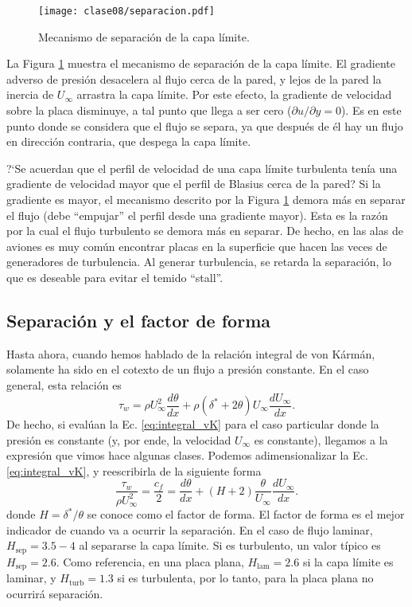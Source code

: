 \begin{figure}
\centering
\texttt{[image: clase08/separacion.pdf]}
\caption{Mecanismo de separación de la capa límite.}
\label{fig:separacion}
\end{figure}

La Figura \ref{fig:separacion} muestra el mecanismo de separación de la capa límite.
El gradiente adverso de presión desacelera al flujo cerca de la pared, y lejos de la pared la inercia de $U_\infty$ arrastra la capa límite.
Por este efecto, la gradiente de velocidad sobre la placa disminuye, a tal punto que llega a ser cero ($\partial u/\partial y=0$).
Es en este punto donde se considera que el flujo se separa, ya que después de él hay un flujo en dirección contraria, que despega la capa límite.

\mbox{?`}Se acuerdan que el perfil de velocidad de una capa límite turbulenta tenía una gradiente de velocidad mayor que el perfil de Blasius cerca de la pared?
Si la gradiente es mayor, el mecanismo descrito por la Figura \ref{fig:separacion} demora más en separar el flujo (debe ``empujar'' el perfil desde una gradiente mayor).
Esta es la razón por la cual el flujo turbulento se demora más en separar.
De hecho, en las alas de aviones es muy común encontrar placas en la superficie que hacen las veces de generadores de turbulencia.
Al generar turbulencia, se retarda la separación, lo que es deseable para evitar el temido ``stall''.

\subsection*{Separación y el factor de forma}

Hasta ahora, cuando hemos hablado de la relación integral de von Kármán, solamente ha sido en el cotexto de un flujo a presión constante.
En el caso general, esta relación es
%
\begin{equation}\label{eq:integral_vK}
\tau_w = \rho U_\infty^2\frac{d\theta}{dx} + \rho(\delta^*+2\theta)U_\infty \frac{dU_\infty}{dx}.
\end{equation}
%
De hecho, si evalúan la Ec. \eqref{eq:integral_vK} para el caso particular donde la presión es constante (y, por ende, la velocidad $U_\infty$ es constante), llegamos a la expresión que vimos hace algunas clases.
Podemos adimensionalizar la Ec. \eqref{eq:integral_vK}, y reescribirla de la siguiente forma
%
\begin{equation}
\frac{\tau_w}{\rho U_\infty^2} = \frac{c_f}{2} = \frac{d\theta}{dx} + (H+2)\frac{\theta}{U_\infty} \frac{dU_\infty}{dx}.
\end{equation}
%
donde $H=\delta^*/\theta$ se conoce como el factor de forma.
El factor de forma es el mejor indicador de cuando va a ocurrir la separación. 
En el caso de flujo laminar, $H_\text{sep}=3.5-4$ al separarse la capa límite.
Si es turbulento, un valor típico es $H_\text{sep}=2.6$.
Como referencia, en una placa plana, $H_\text{lam} = 2.6$ si la capa límite es laminar, y $H_\text{turb} = 1.3$ si es turbulenta, por lo tanto, para la placa plana no ocurrirá separación.


